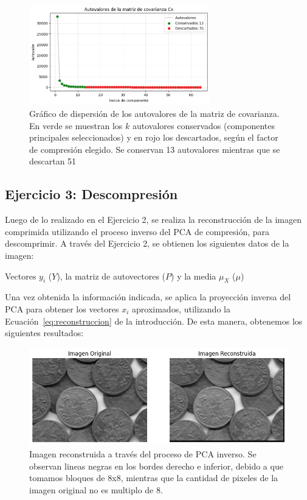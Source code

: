 \documentclass[a4paper,12pt]{article}
\begin{document}
\begin{figure}[H]
    \centering
    \includegraphics[width=0.7\textwidth]{Ejercicio2.png}
    \caption{Gráfico de dispersión de los autovalores de la matriz de covarianza. En verde se muestran los $k$ autovalores conservados (componentes principales seleccionados) y en rojo los descartados, según el factor de compresión elegido. Se conservan 13 autovalores mientras que se descartan 51}
    \label{fig:eigvals2}
\end{figure}


\newpage
\subsection*{Ejercicio 3: Descompresión}

Luego de lo realizado en el Ejercicio 2, se realiza la reconstrucción de la imagen comprimida utilizando el proceso inverso del PCA de compresión, para descomprimir.
A través del Ejercicio 2, se obtienen los siguientes datos de la imagen:

\vspace{1em}

Vectores \(y_i\) (\(Y\)), la matriz de autovectores (\(P\)) y la media \(\mu_X\) (\(\mu\))

\vspace{1em}

Una vez obtenida la información indicada, se aplica la proyección inversa del PCA para obtener los vectores $x_i$ aproximados, utilizando la Ecuación~\ref{eq:reconstruccion} de la introducción.
De esta manera, obtenemos los siguientes resultados:

\begin{figure}[H]
    \centering
    \includegraphics[width=1\textwidth]{Ejercicio3.png}
    \caption{Imagen reconstruida a través del proceso de PCA inverso. Se observan lineas negras en los bordes derecho e inferior, debido a que tomamos bloques de 8x8, mientras que la cantidad de pixeles de la imagen original no es multiplo de 8.}
    \label{fig:ej3}
\end{figure}
\end{document}
